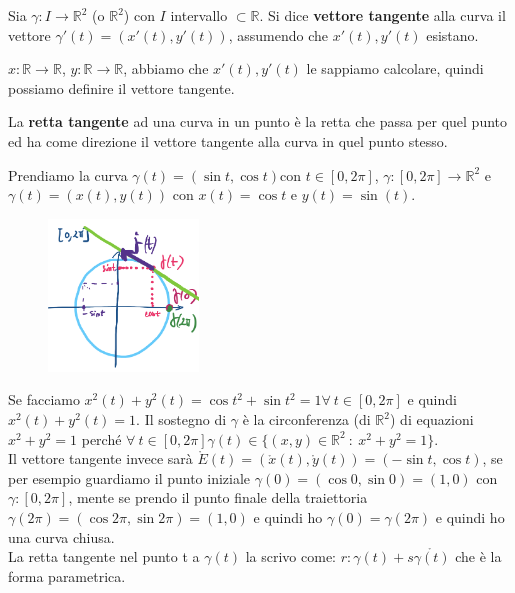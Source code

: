 \begin{definition}
Sia $\gamma: I \to \mathbb{R}^2$ (o $\mathbb{R}^2$) con $I$ intervallo $\subset \mathbb{R}$. Si dice \textbf{vettore tangente} alla curva il vettore $\gamma'(t) = (x'(t), y'(t))$, assumendo che $x'(t), y'(t)$ esistano.
\end{definition}

\begin{observation}
$x: \mathbb{R} \to \mathbb{R}$, $y: \mathbb{R} \to \mathbb{R}$, abbiamo che $x'(t), y'(t)$ le sappiamo calcolare, quindi possiamo definire il vettore tangente.
\end{observation}

\begin{definition}
La \textbf{retta tangente} ad una curva in un punto è la retta che passa per quel punto ed ha come direzione il vettore tangente alla curva in quel punto stesso.
\end{definition}

\vspace{50pt}
\begin{example}
Prendiamo la curva $\gamma(t) = (\sin{t}, \cos{t})$con $t \in [0,2\pi]$, $\gamma: [0,2\pi] \to \mathbb{R}^2$ e $\gamma(t) = (x(t), y(t))$ con $x(t) = \cos{t}$ e $y(t) = \sin(t)$.
\end{example}
\begin{figure}
    \vspace{-10pt}
    \centering
    \includegraphics[width=4cm]{images/ess-curva-piano.png}
\end{figure}
 Se facciamo $x^2(t) + y^2(t) = \cos{t}^2 + \sin{t}^2 = 1 \forall \: t \in [0, 2\pi]$ e quindi $x^2(t) + y^2(t) = 1$. Il sostegno di $\gamma$ è la circonferenza (di $\mathbb{R}^2$) di equazioni $x^2 + y^2 = 1$ perché $\forall \: t \in [0,2\pi] \gamma(t) \in \{(x,y) \in \mathbb{R}^2 \::\: x^2+y^2 = 1\}$.\\
Il vettore tangente invece sarà $\mathring{E}(t) = (\mathring{x}(t), \mathring{y}(t)) = (-\sin{t}, \cos{t})$, se per esempio guardiamo il punto iniziale $\gamma(0) = (\cos{0}, \sin{0}) = (1,0)$ con $\gamma: [0,2\pi]$, mente se prendo il punto finale della traiettoria $\gamma(2\pi) = (\cos{2\pi}, \sin{2\pi}) = (1,0)$ e quindi ho $\gamma(0) = \gamma(2\pi)$ e quindi ho una curva chiusa.\\
La retta tangente nel punto t a $\gamma(t)$ la scrivo come: $r: \gamma(t) + s\mathring{\gamma(t)}$ che è la forma parametrica.

